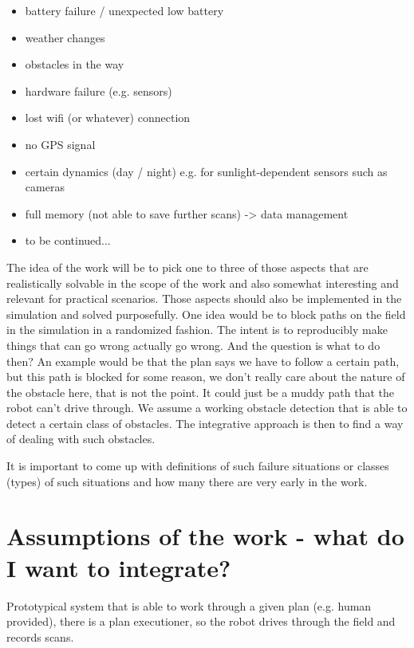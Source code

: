 \documentclass[german, master, expose, latin1]{base/thesis_KBS}
\begin{document}
\begin{itemize}
    \item battery failure / unexpected low battery
    \item weather changes
    \item obstacles in the way
    \item hardware failure (e.g. sensors)
    \item lost wifi (or whatever) connection
    \item no GPS signal
    \item certain dynamics (day / night) e.g. for sunlight-dependent sensors such as cameras
    \item full memory (not able to save further scans) -> data management
    \item to be continued...
\end{itemize}

The idea of the work will be to pick one to three of those aspects that are realistically solvable in the scope of the work and also somewhat interesting and 
relevant for practical scenarios. Those aspects should also be implemented in the simulation and solved purposefully.\newline
One idea would be to block paths on the field in the simulation in a randomized fashion. The intent is to reproducibly make things that can go wrong actually go wrong.
And the question is what to do then? An example would be that the plan says we have to follow a certain path, but this path is blocked for some reason, we don't really
care about the nature of the obstacle here, that is not the point. It could just be a muddy path that the robot can't drive through. We assume a working obstacle detection
that is able to detect a certain class of obstacles. The integrative approach is then to find a way of dealing with such obstacles.\newline

It is important to come up with definitions of such failure situations or classes (types) of such situations and how many there are very early in the work.

\section{Assumptions of the work - what do I want to integrate?}

Prototypical system that is able to work through a given plan (e.g. human provided), there is a plan executioner, so the robot drives through the field and records scans.\newline
\end{document}
